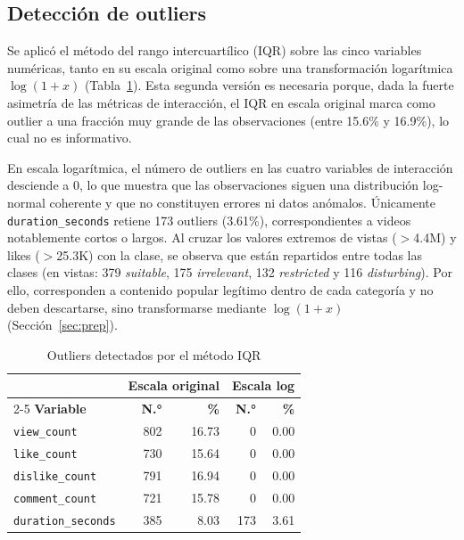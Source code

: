 \documentclass[conference]{IEEEtran}
\begin{document}
\subsection{Detección de outliers}\label{sec:outliers}
Se aplicó el método del rango intercuartílico (IQR) sobre las cinco variables numéricas, tanto en su escala original como sobre una transformación logarítmica $\log(1+x)$ (Tabla~\ref{tab:out}). Esta segunda versión es necesaria porque, dada la fuerte asimetría de las métricas de interacción, el IQR en escala original marca como outlier a una fracción muy grande de las observaciones (entre 15.6\% y 16.9\%), lo cual no es informativo.

En escala logarítmica, el número de outliers en las cuatro variables de interacción desciende a 0, lo que muestra que las observaciones siguen una distribución log-normal coherente y que no constituyen errores ni datos anómalos. Únicamente \texttt{duration\_seconds} retiene 173 outliers (3.61\%), correspondientes a videos notablemente cortos o largos. Al cruzar los valores extremos de vistas ($>$4.4M) y likes ($>$25.3K) con la clase, se observa que están repartidos entre todas las clases (en vistas: 379 \textit{suitable}, 175 \textit{irrelevant}, 132 \textit{restricted} y 116 \textit{disturbing}). Por ello, corresponden a contenido popular legítimo dentro de cada categoría y no deben descartarse, sino transformarse mediante $\log(1+x)$ (Sección~\ref{sec:prep}).

\begin{table}[!t]
\caption{Outliers detectados por el método IQR}
\begin{center}
\footnotesize
\begin{tabular}{|l|r|r|r|r|}
\hline
 & \multicolumn{2}{c|}{\textbf{Escala original}} & \multicolumn{2}{c|}{\textbf{Escala log}} \\
\cline{2-5}
\textbf{Variable} & \textbf{N.°} & \textbf{\%} & \textbf{N.°} & \textbf{\%} \\
\hline
\texttt{view\_count} & 802 & 16.73 & 0 & 0.00 \\
\hline
\texttt{like\_count} & 730 & 15.64 & 0 & 0.00 \\
\hline
\texttt{dislike\_count} & 791 & 16.94 & 0 & 0.00 \\
\hline
\texttt{comment\_count} & 721 & 15.78 & 0 & 0.00 \\
\hline
\texttt{duration\_seconds} & 385 & 8.03 & 173 & 3.61 \\
\hline
\end{tabular}
\label{tab:out}
\end{center}
\end{table}
\end{document}
